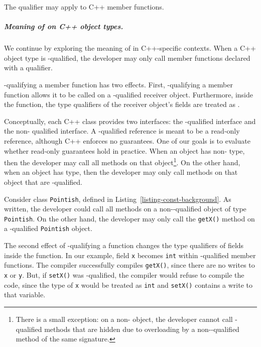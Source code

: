 \begin{listing}[!htb]
  \caption{The \const{} qualifier may apply to C++ member functions.}
  \label{listing-const-background}
  \centering
  
\end{listing}

\subparagraph*{Meaning of \const{} on C++ object types.}
We continue by exploring the meaning of \const{} in C++-specific contexts.
When a C++ object type is \const-qualified,
the developer may only call member functions declared with a
\const{} qualifier.

\const{}-qualifying a member function has two effects.
First, \const{}-qualifying a member function allows it to be called on a
\const{}-qualified receiver object.
Furthermore, inside the function, the type qualifiers of the receiver object's
fields are treated as \const{}.

Conceptually, each C++ class provides two
interfaces: the \const{}-qualified interface and the non-\const{} qualified
interface.
A \const{}-qualified reference is meant to be a read-only
reference, although C++ enforces no guarantees.
One of our goals is to evaluate whether read-only guarantees hold in practice.
When an object has non-\const{} type, then the developer may call all methods on
that object\footnote{There is a small exception: on a non-\const{} object, the
developer cannot call \const{}-qualified methods that are hidden due to
overloading by a non-\const{}-qualified method of the same signature.}.
On the other hand, when an object has \const{} type, then the developer may only
call methods on that object that are \const{}-qualified.

Consider class \texttt{Pointish}, defined in
Listing~\ref{listing-const-background}.
As written, the developer could call all methods on a non-\const{}-qualified
object of type \texttt{Pointish}.
On the other hand, the developer may only call the \texttt{getX()} method on a
\const{}-qualified \texttt{Pointish} object.

The second effect of \const{}-qualifying a function changes the type qualifiers of
fields inside the function.
In our example, field \texttt{x} becomes \texttt{int}
\const{} within \const{}-qualified member functions.
The compiler successfully compiles \texttt{getX()}, since there are no
writes to \texttt{x} or \texttt{y}.
But, if \texttt{setX()} was \const{}-qualified, the compiler would refuse to
compile the code, since the type of \texttt{x} would be treated as \const{}
\texttt{int} and \texttt{setX()} contains a write to that variable.

